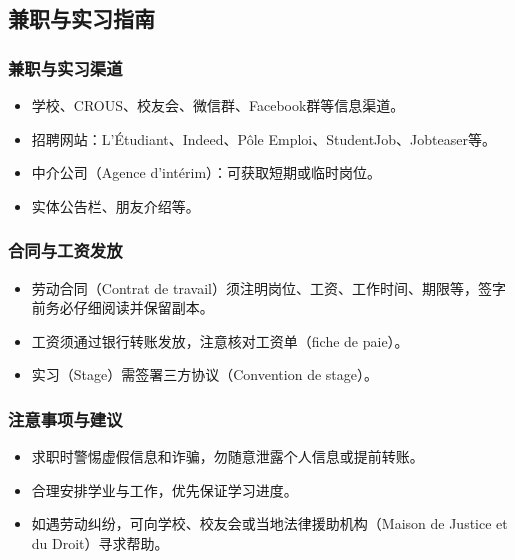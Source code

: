 \subsection{兼职与实习指南}

\subsubsection{兼职与实习渠道}
\begin{itemize}
    \item 学校、CROUS、校友会、微信群、Facebook群等信息渠道。
    \item 招聘网站：L'Étudiant、Indeed、Pôle Emploi、StudentJob、Jobteaser等。
    \item 中介公司（Agence d’intérim）：可获取短期或临时岗位。
    \item 实体公告栏、朋友介绍等。
\end{itemize}

\subsubsection{合同与工资发放}
\begin{itemize}
    \item 劳动合同（Contrat de travail）须注明岗位、工资、工作时间、期限等，签字前务必仔细阅读并保留副本。
    \item 工资须通过银行转账发放，注意核对工资单（fiche de paie）。
    \item 实习（Stage）需签署三方协议（Convention de stage）。
\end{itemize}

\subsubsection{注意事项与建议}
\begin{itemize}
    \item 求职时警惕虚假信息和诈骗，勿随意泄露个人信息或提前转账。
    \item 合理安排学业与工作，优先保证学习进度。
    \item 如遇劳动纠纷，可向学校、校友会或当地法律援助机构（Maison de Justice et du Droit）寻求帮助。
\end{itemize}

